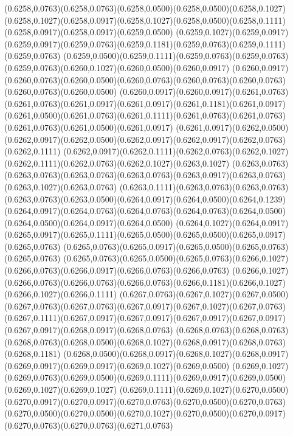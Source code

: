 (0.6258,0.0763)(0.6258,0.0763)(0.6258,0.0500)(0.6258,0.0500)(0.6258,0.1027)
\PST@Solid(0.6258,0.1027)(0.6258,0.0917)(0.6258,0.1027)(0.6258,0.0500)(0.6258,0.1111)(0.6258,0.0917)(0.6258,0.0917)(0.6259,0.0500)
(0.6259,0.1027)(0.6259,0.0917)(0.6259,0.0917)(0.6259,0.0763)(0.6259,0.1181)(0.6259,0.0763)(0.6259,0.1111)(0.6259,0.0763)
(0.6259,0.0500)(0.6259,0.1111)(0.6259,0.0763)(0.6259,0.0763)(0.6259,0.0763)(0.6260,0.1027)(0.6260,0.0500)(0.6260,0.0917)
(0.6260,0.0917)(0.6260,0.0763)(0.6260,0.0500)(0.6260,0.0763)(0.6260,0.0763)(0.6260,0.0763)(0.6260,0.0763)(0.6260,0.0500)
(0.6260,0.0917)(0.6260,0.0917)(0.6261,0.0763)(0.6261,0.0763)(0.6261,0.0917)(0.6261,0.0917)(0.6261,0.1181)(0.6261,0.0917)
(0.6261,0.0500)(0.6261,0.0763)(0.6261,0.1111)(0.6261,0.0763)(0.6261,0.0763)(0.6261,0.0763)(0.6261,0.0500)(0.6261,0.0917)
(0.6261,0.0917)(0.6262,0.0500)(0.6262,0.0917)(0.6262,0.0500)(0.6262,0.0917)(0.6262,0.0917)(0.6262,0.0763)(0.6262,0.1111)
(0.6262,0.0917)(0.6262,0.1111)(0.6262,0.0763)(0.6262,0.1027)(0.6262,0.1111)(0.6262,0.0763)(0.6262,0.1027)(0.6263,0.1027)
(0.6263,0.0763)(0.6263,0.0763)(0.6263,0.0763)(0.6263,0.0763)(0.6263,0.0917)(0.6263,0.0763)(0.6263,0.1027)(0.6263,0.0763)
(0.6263,0.1111)(0.6263,0.0763)(0.6263,0.0763)(0.6263,0.0763)(0.6263,0.0500)(0.6264,0.0917)(0.6264,0.0500)(0.6264,0.1239)
(0.6264,0.0917)(0.6264,0.0763)(0.6264,0.0763)(0.6264,0.0763)(0.6264,0.0500)(0.6264,0.0500)(0.6264,0.0917)(0.6264,0.0500)
(0.6264,0.1027)(0.6264,0.0917)(0.6265,0.0917)(0.6265,0.1111)(0.6265,0.0500)(0.6265,0.0500)(0.6265,0.0917)(0.6265,0.0763)
(0.6265,0.0763)(0.6265,0.0917)(0.6265,0.0500)(0.6265,0.0763)(0.6265,0.0763)
\PST@Solid(0.6265,0.0763)(0.6265,0.0500)(0.6265,0.0763)(0.6266,0.1027)(0.6266,0.0763)(0.6266,0.0917)(0.6266,0.0763)(0.6266,0.0763)
(0.6266,0.1027)(0.6266,0.0763)(0.6266,0.0763)(0.6266,0.0763)(0.6266,0.1181)(0.6266,0.1027)(0.6266,0.1027)(0.6266,0.1111)
(0.6267,0.0763)(0.6267,0.1027)(0.6267,0.0500)(0.6267,0.0763)(0.6267,0.0763)(0.6267,0.0917)(0.6267,0.1027)(0.6267,0.0763)
(0.6267,0.1111)(0.6267,0.0917)(0.6267,0.0917)(0.6267,0.0917)(0.6267,0.0917)(0.6267,0.0917)(0.6268,0.0917)(0.6268,0.0763)
(0.6268,0.0763)(0.6268,0.0763)(0.6268,0.0763)(0.6268,0.0500)(0.6268,0.1027)(0.6268,0.0917)(0.6268,0.0763)(0.6268,0.1181)
(0.6268,0.0500)(0.6268,0.0917)(0.6268,0.1027)(0.6268,0.0917)(0.6269,0.0917)(0.6269,0.0917)(0.6269,0.1027)(0.6269,0.0500)
(0.6269,0.1027)(0.6269,0.0763)(0.6269,0.0500)(0.6269,0.1111)(0.6269,0.0917)(0.6269,0.0500)(0.6269,0.1027)(0.6269,0.1027)
(0.6269,0.1111)(0.6269,0.1027)(0.6270,0.0500)(0.6270,0.0917)(0.6270,0.0917)(0.6270,0.0763)(0.6270,0.0500)(0.6270,0.0763)
(0.6270,0.0500)(0.6270,0.0500)(0.6270,0.1027)(0.6270,0.0500)(0.6270,0.0917)(0.6270,0.0763)(0.6270,0.0763)(0.6271,0.0763)
